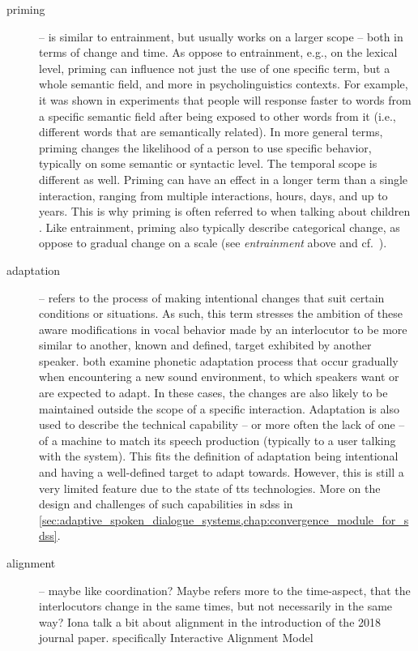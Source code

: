 \begin{description}
	\item[priming] -- is similar to entrainment, but usually works on a larger scope -- both in terms of change and time.
	As oppose to entrainment, e.g., on the lexical level, priming can influence not just the use of one specific term, but a whole semantic field, and more in psycholinguistics contexts.
	For example, it was shown in experiments \cite[e.g.,][]{Meyer1971facilitation, Schvaneveldt1973retrieval} that people will response faster to words from a specific semantic field after being exposed to other words from it (i.e., different words that are semantically related).
	In more general terms, priming changes the likelihood of a person to use specific behavior, typically on some semantic or syntactic level.
	The temporal scope is different as well.
	Priming can have an effect in a longer term than a single interaction, ranging from multiple interactions, hours, days, and up to years.
	This is why priming is often referred to when talking about children \cite[see e.g.\ ][]{Huttenlocher2004syntactic, Wansink2012would}.
	Like entrainment, priming also typically describe categorical change, as oppose to gradual change on a scale (see \textit{entrainment} above and cf.\ \citet{Reitter2006computational, Pace2013concept}).
	
	\item[adaptation] -- refers to the process of making intentional changes that suit certain conditions or situations.
	As such, this term stresses the ambition of these aware modifications in vocal behavior made by an interlocutor to be more similar to another, known and defined, target exhibited by another speaker.
	\citet{Kang2010emergence, Hwang2015phonetic} both examine phonetic adaptation process that occur gradually when encountering a new sound environment, to which speakers want or are expected to adapt.
	In these cases, the changes are also likely to be maintained outside the scope of a specific interaction.
	Adaptation is also used to describe the technical capability -- or more often the lack of one -- of a machine to match its speech production (typically to a user talking with the system).
	This fits the definition of adaptation being intentional and having a well-defined target to adapt towards.
	However, this is still a very limited feature due to the state of \ac{tts} technologies.
	More on the design and challenges of such capabilities in \acp{sds} in \cref{sec:adaptive_spoken_dialogue_systems,chap:convergence_module_for_sdss}.
	
	\item[alignment] -- maybe like coordination? Maybe refers more to the time-aspect, that the interlocutors change in the same times, but not necessarily in the same way? Iona talk a bit about alignment in the introduction of the 2018 journal paper.
	specifically Interactive Alignment Model \citep{Pickering2004behavioral}
	

\end{description}
